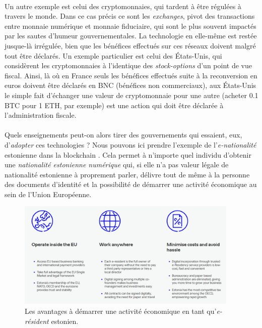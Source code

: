 \paragraph{} Un autre exemple est celui des cryptomonnaies, qui tardent à être régulées à travers le monde. Dans ce cas
précis ce sont les \emph{exchanges}, pivot des transactions entre monnaie numérique et monnaie fiduciaire, qui sont le 
plus souvent impactés par les sautes d'humeur gouvernementales. La technologie en elle-même est restée jusque-là irrégulée,
bien que les bénéfices effectués sur ces réseaux doivent malgré tout être déclarés. Un exemple particulier est celui des 
États-Unis, qui considèrent les cryptomonnaies à l'identique des \emph{stock-options} d'un point de vue fiscal. Ainsi, 
là où en France seuls les bénéfices effectués suite à la reconversion en euros doivent être déclarés en BNC (bénéfices non
commerciaux), aux États-Unis le simple fait d'échanger une valeur de cryptomonnaie pour une autre (acheter 0.1 BTC pour 
1 ETH, par exemple) est une action qui doit être déclarée à l'administration fiscale.

\paragraph{} Quels enseignements peut-on alors tirer des gouvernements qui essaient, eux, d'\emph{adopter} ces technologies ? 
Nous pouvons ici prendre l'exemple de l'\emph{e-nationalité} estonienne dans la blockchain \cite{Blockchain3}. Cela permet
à n'importe quel individu d'obtenir une \emph{nationalité estonienne numérique} qui, si elle n'a pas valeur légale de
nationalité estonienne à proprement parler, délivre tout de même à la personne des documents d'identité et la possibilité
de démarrer une activité économique au sein de l'Union Européenne.

\begin{figure}[ht]
    \centering
    \includegraphics[width=400px]{chapters/02/images/eresidency.png}
    \caption{\label{eresidency}Les avantages à démarrer une activité économique en tant qu'\emph{e-résident} estonien.}
\end{figure}

